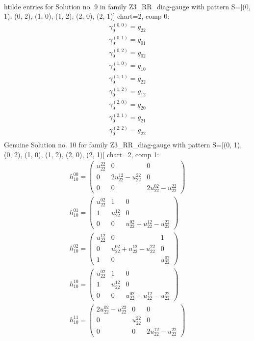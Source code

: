 \documentclass[a4paper, 11pt, twoside, onecolumn]{article}
\begin{document}
\begin{landscape}
\begin{gather*}
\end{gather*} 
htilde entries for Solution no. 9 in family Z3_RR_diag-gauge with pattern S=[(0, 1), (0, 2), (1, 0), (1, 2), (2, 0), (2, 1)] chart=2, comp 0: 
\begin{gather*} 
	 \gamma^{(0, 0)}_9=g_{22}\\ 
	 \gamma^{(0, 1)}_9=g_{01}\\ 
	 \gamma^{(0, 2)}_9=g_{02}\\ 
	 \gamma^{(1, 0)}_9=g_{10}\\ 
	 \gamma^{(1, 1)}_9=g_{22}\\ 
	 \gamma^{(1, 2)}_9=g_{12}\\ 
	 \gamma^{(2, 0)}_9=g_{20}\\ 
	 \gamma^{(2, 1)}_9=g_{21}\\ 
	 \gamma^{(2, 2)}_9=g_{22}\\ 
\end{gather*} 
Genuine Solution no. 10 for family Z3_RR_diag-gauge with pattern S=[(0, 1), (0, 2), (1, 0), (1, 2), (2, 0), (2, 1)] chart=2, comp 1: 
\begin{gather*} 
	 h_10^{00}=\begin{pmatrix}u^{22}_{22} & 0 & 0\\0 & 2 u^{12}_{22} - u^{22}_{22} & 0\\0 & 0 & 2 u^{02}_{22} - u^{22}_{22}\end{pmatrix}\\ 
	 h_10^{01}=\begin{pmatrix}u^{02}_{22} & 1 & 0\\1 & u^{12}_{22} & 0\\0 & 0 & u^{02}_{22} + u^{12}_{22} - u^{22}_{22}\end{pmatrix}\\ 
	 h_10^{02}=\begin{pmatrix}u^{12}_{22} & 0 & 1\\0 & u^{02}_{22} + u^{12}_{22} - u^{22}_{22} & 0\\1 & 0 & u^{02}_{22}\end{pmatrix}\\ 
	 h_10^{10}=\begin{pmatrix}u^{02}_{22} & 1 & 0\\1 & u^{12}_{22} & 0\\0 & 0 & u^{02}_{22} + u^{12}_{22} - u^{22}_{22}\end{pmatrix}\\ 
	 h_10^{11}=\begin{pmatrix}2 u^{02}_{22} - u^{22}_{22} & 0 & 0\\0 & u^{22}_{22} & 0\\0 & 0 & 2 u^{12}_{22} - u^{22}_{22}\end{pmatrix}\\ 

\end{gather*}
\end{landscape}
\end{document}
